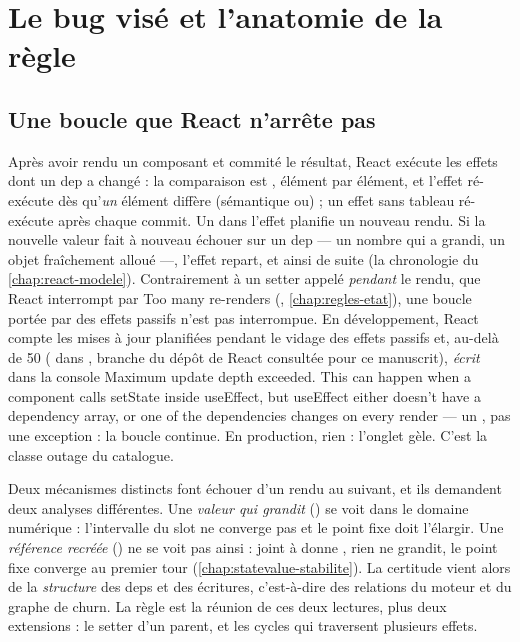 \section{Le bug visé et l'anatomie de la règle}
\label{sec:infinite-loop-anatomie}

\subsection{Une boucle que React n'arrête pas}

\begin{react}
Après avoir rendu un composant et commité le résultat, React exécute les effets  dont un dep a changé : la comparaison est , élément par élément, et l'effet ré-exécute dès qu'\emph{un} élément diffère (sémantique \og ou\fg) ; un effet sans tableau ré-exécute après chaque commit. Un  dans l'effet planifie un nouveau rendu. Si la nouvelle valeur fait à nouveau échouer  sur un dep --- un nombre qui a grandi, un objet fraîchement alloué ---, l'effet repart, et ainsi de suite (la chronologie du \cref{chap:react-modele}). Contrairement à un setter appelé \emph{pendant} le rendu, que React interrompt par \og Too many re-renders\fg{} (, \cref{chap:regles-etat}), une boucle portée par des effets passifs n'est pas interrompue. En développement, React compte les mises à jour planifiées pendant le vidage des effets passifs et, au-delà de 50 ( dans , branche  du dépôt de React consultée pour ce manuscrit), \emph{écrit} dans la console \og Maximum update depth exceeded. This can happen when a component calls setState inside useEffect, but useEffect either doesn't have a dependency array, or one of the dependencies changes on every render\fg{} --- un , pas une exception : la boucle continue. En production, rien : l'onglet gèle. C'est la classe \og outage\fg{} du catalogue.
\end{react}

Deux mécanismes distincts font échouer  d'un rendu au suivant, et ils demandent deux analyses différentes. Une \emph{valeur qui grandit} () se voit dans le domaine numérique : l'intervalle du slot ne converge pas et le point fixe doit l'élargir. Une \emph{référence recréée} () ne se voit pas ainsi :  joint à  donne , rien ne grandit, le point fixe converge au premier tour (\cref{chap:statevalue-stabilite}). La certitude vient alors de la \emph{structure} des deps et des écritures, c'est-à-dire des relations du moteur et du graphe de churn. La règle est la réunion de ces deux lectures, plus deux extensions : le setter d'un parent, et les cycles qui traversent plusieurs effets.

